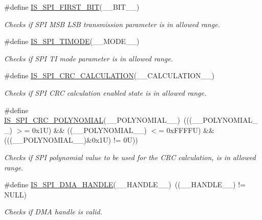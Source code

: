 \begin{DoxyCompactItemize}
\#define \hyperlink{group___s_p_i___private___macros_ga780c503aa8adae30dea1f034ac500d7f}{I\+S\+\_\+\+S\+P\+I\+\_\+\+F\+I\+R\+S\+T\+\_\+\+B\+IT}(\+\_\+\+\_\+\+B\+I\+T\+\_\+\+\_\+)
\begin{DoxyCompactList}\small\item\em Checks if S\+PI M\+SB L\+SB transmission parameter is in allowed range. \end{DoxyCompactList}\item 
\#define \hyperlink{group___s_p_i___private___macros_ga8e3c348af57cf973277018958fccfed9}{I\+S\+\_\+\+S\+P\+I\+\_\+\+T\+I\+M\+O\+DE}(\+\_\+\+\_\+\+M\+O\+D\+E\+\_\+\+\_\+)
\begin{DoxyCompactList}\small\item\em Checks if S\+PI TI mode parameter is in allowed range. \end{DoxyCompactList}\item 
\#define \hyperlink{group___s_p_i___private___macros_ga5416429a2e9024b142c972eacb1fd021}{I\+S\+\_\+\+S\+P\+I\+\_\+\+C\+R\+C\+\_\+\+C\+A\+L\+C\+U\+L\+A\+T\+I\+ON}(\+\_\+\+\_\+\+C\+A\+L\+C\+U\+L\+A\+T\+I\+O\+N\+\_\+\+\_\+)
\begin{DoxyCompactList}\small\item\em Checks if S\+PI C\+RC calculation enabled state is in allowed range. \end{DoxyCompactList}\item 
\#define \hyperlink{group___s_p_i___private___macros_ga1b4b6bb5771cb0070af660d169d4ef09}{I\+S\+\_\+\+S\+P\+I\+\_\+\+C\+R\+C\+\_\+\+P\+O\+L\+Y\+N\+O\+M\+I\+AL}(\+\_\+\+\_\+\+P\+O\+L\+Y\+N\+O\+M\+I\+A\+L\+\_\+\+\_\+)~(((\+\_\+\+\_\+\+P\+O\+L\+Y\+N\+O\+M\+I\+A\+L\+\_\+\+\_\+) $>$= 0x1\+U) \&\& ((\+\_\+\+\_\+\+P\+O\+L\+Y\+N\+O\+M\+I\+A\+L\+\_\+\+\_\+) $<$= 0x\+F\+F\+F\+F\+U) \&\& (((\+\_\+\+\_\+\+P\+O\+L\+Y\+N\+O\+M\+I\+A\+L\+\_\+\+\_\+)\&0x1\+U) != 0\+U))
\begin{DoxyCompactList}\small\item\em Checks if S\+PI polynomial value to be used for the C\+RC calculation, is in allowed range. \end{DoxyCompactList}\item 
\#define \hyperlink{group___s_p_i___private___macros_gae54950bcff11d9165b99957cf8746ae4}{I\+S\+\_\+\+S\+P\+I\+\_\+\+D\+M\+A\+\_\+\+H\+A\+N\+D\+LE}(\+\_\+\+\_\+\+H\+A\+N\+D\+L\+E\+\_\+\+\_\+)~((\+\_\+\+\_\+\+H\+A\+N\+D\+L\+E\+\_\+\+\_\+) != N\+U\+LL)
\begin{DoxyCompactList}\small\item\em Checks if D\+MA handle is valid. \end{DoxyCompactList}\end{DoxyCompactItemize}


